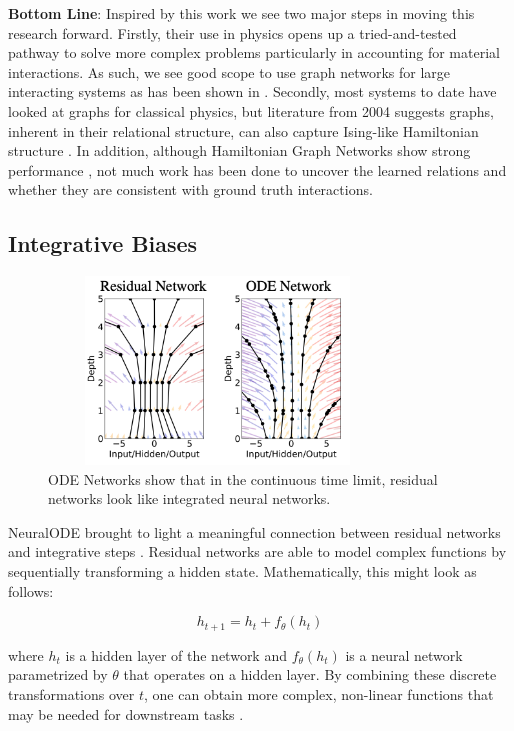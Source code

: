 \documentclass{article}
\begin{document}
\textbf{Bottom Line}: Inspired by this work we see two major steps in moving this research forward. Firstly, their use in physics opens up a tried-and-tested pathway to solve more complex problems particularly in accounting for material interactions. As such, we see good scope to use graph networks for large interacting systems as has been shown in \cite{sanchez-gonzalez_learning_2020}. Secondly, most systems to date have looked at graphs for classical physics, but literature from 2004 suggests graphs, inherent in their relational structure, can also capture Ising-like Hamiltonian structure \cite{rezek_operator_nodate}. In addition, although Hamiltonian Graph Networks show strong performance \cite{battaglia_relational_2018}, not much work has been done to uncover the learned relations and whether they are consistent with ground truth interactions.


\subsection{Integrative Biases}

\begin{figure}[h]
\centering
\includegraphics[width=0.8\textwidth,height=5cm]{figures/2odenet.png}
\caption{ ODE Networks \cite{chen_neural_2018} show that in the continuous time limit, residual networks look like integrated neural networks.}
\label{fig.odenet}
\end{figure}
NeuralODE brought to light a meaningful connection between residual networks and integrative steps \cite{chang_reversible_2017,chen_neural_2018}. Residual networks are able to model complex functions by sequentially transforming a hidden state. Mathematically, this might look as follows:

\begin{equation}
h_{t+1} = h_t + f_{\theta}(h_t)
\label{eqn.odedisc}
\end{equation}

where $h_t$ is a hidden layer of the network and $f_{\theta}(h_t)$ is a neural network parametrized by $\theta$ that operates on a hidden layer. By combining these discrete transformations over $t$, one can obtain more complex, non-linear functions that may be needed for downstream tasks \cite{he_deep_2015}.
\end{document}

